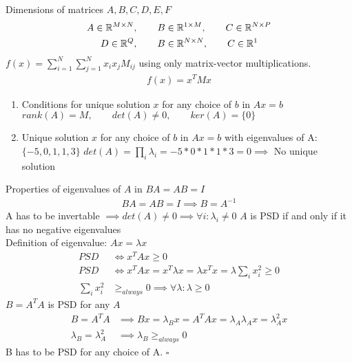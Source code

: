 %
%
Dimensions of matrices $A, B, C, D, E, F$
%
\begin{align}
	A \in \mathbb{R}^{M \times N}, \qquad B &\in \mathbb{R}^{1 \times M}, \qquad C \in \mathbb{R}^{N \times P}\\
	D \in \mathbb{R}^{Q}, \qquad B &\in \mathbb{R}^{N \times N}, \qquad C \in \mathbb{R}^{1}
\end{align}%
%
$f(x) = \sum_{i=1}^{N}\sum_{j=1}^{N}x_ix_jM_{ij}$ using only matrix-vector multiplications.
%
\begin{align}
	f(x) = x^TMx
\end{align}
%
%
\begin{enumerate}[label=(\alph*)]
	\item Conditions for unique solution $x$ for any choice of $b$ in $Ax=b$ 
	\subitem $rank(A)=M,\qquad det(A) \neq 0,\qquad ker(A) = \{0\}$
	
	\item Unique solution $x$ for any choice of $b$ in $Ax=b$ with eigenvalues of A: $\{-5,0,1,1,3\}$
	\subitem $det(A) = \prod_{i}\lambda_i = -5*0*1*1*3 = 0 \implies$ No unique solution
\end{enumerate}
%
%
Properties of eigenvalues of $A$ in $BA = AB = I$
%
\begin{align}
BA = AB = I \implies B = A^{-1}
\end{align}
A has to be invertable $\implies det(A) \neq 0 \implies \forall i: \lambda_i \neq 0$
%
$A$ is PSD if and only if it has no negative eigenvalues\\
%
Definition of eigenvalue: $Ax = \lambda x$
%
\begin{align}
	PSD &\Leftrightarrow x^TAx \geq 0\\
	PSD &\Leftrightarrow x^TAx = x^T \lambda x = \lambda x^T x = \lambda \sum_{i} x_i^2 \geq 0\\
	\sum_{i} x_i^2 &\geq_{always} 0 \implies \forall \lambda: \lambda \geq 0
\end{align}
%
%
$B = A^T A$ is PSD for any $A$
%
\begin{align}
	B = A^T A &\implies Bx = \lambda_B x = A^T A x = \lambda_A \lambda_A x = \lambda_A^2 x\\
	\lambda_B = \lambda_A^2 &\implies \lambda_B \geq_{always} 0
\end{align}
B has to be PSD for any choice of A. \qquad \ensuremath{\square} 









%
%


